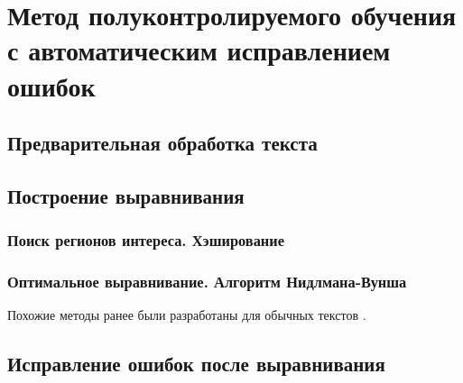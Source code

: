 \documentclass{main.tex}[subfiles]
\begin{document}
\section{Метод полуконтролируемого обучения с автоматическим исправлением ошибок}
\subsection{Предварительная обработка текста}
\subsection{Построение выравнивания}
\subsubsection{Поиск регионов интереса. Хэширование}
\subsubsection{Оптимальное выравнивание. Алгоритм Нидлмана-Вунша}
Похожие методы ранее были разработаны для обычных текстов \cite{muller2021word_aln}.

\subsection{Исправление ошибок после выравнивания}
\end{document}
